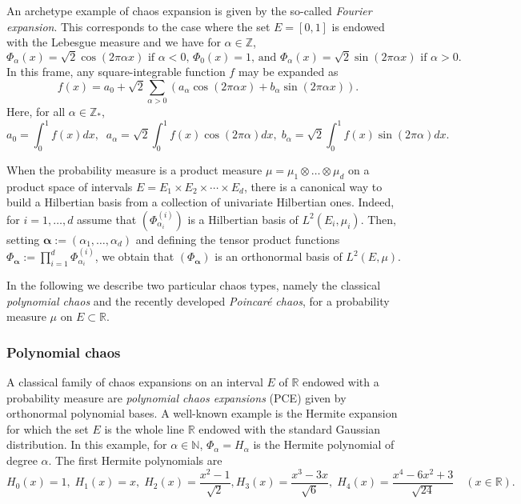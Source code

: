 \documentclass[a4paper,11pt]{article}
\newcommand{\Rr}{{\mathbb R}}
\newcommand{\Nn}{\mathbb{N}}
\newcommand{\ve}[1]{\boldsymbol{#1}}
\newcommand{\alp}{{\ve{\alpha}}}
\newcommand{\Phal}{\Phi_{\alp}}
\theoremstyle{definition}
\theoremstyle{remark}
\theoremstyle{theorem}
\begin{document}
An archetype example of chaos expansion is given by the so-called \textit{Fourier expansion}. This corresponds to the case where the set $E=[0,1]$ is endowed with the Lebesgue measure and we have for $\alpha\in\mathbb{Z}$,
\begin{equation*}
\Phi_\alpha(x)=\sqrt{2}\cos(2\pi\alpha x) \text{ if $\alpha < 0$, }
\Phi_0(x)=1 \text{, and } 
\Phi_\alpha(x)=\sqrt{2}\sin(2\pi\alpha x) \text{ if $\alpha > 0$.}
\end{equation*}
In this frame, any square-integrable function $f$ may be expanded as 
\begin{equation*}
f(x)=a_0+\sqrt{2}\sum_{\alpha>0}\left(a_\alpha\cos(2\pi\alpha x)+b_\alpha\sin(2\pi\alpha x)\right).
\end{equation*}
Here, for all $\alpha\in\mathbb{Z}_*$,
\begin{equation*}
a_0=\int_0^1f(x)dx, \;\;
a_\alpha = \sqrt{2} \int_0^1f(x)\cos(2\pi\alpha)dx,\; 
b_\alpha = \sqrt{2} \int_0^1f(x)\sin(2\pi\alpha)dx.
\end{equation*}

When the probability measure is a product measure $\mu = \mu_1 \otimes \dots \otimes \mu_d$ on a product space of intervals
$E=E_1\times E_2\times \cdots \times E_d$, 
there is a canonical way to build a Hilbertian basis from a collection of univariate Hilbertian ones. 
Indeed, for $i=1,\ldots, d$ assume that $(\Phi^{(i)}_{\alpha_i})$ is a Hilbertian basis of $L^2(E_i,\mu_i)$. Then, setting
$\alp:=(\alpha_1,\ldots,\alpha_d)$ and defining the tensor product functions $\Phal:=\prod_{i=1}^{d} \Phi^{(i)}_{\alpha_i}$,
we obtain that $(\Phal)$ is an orthonormal  basis of $L^2(E,\mu)$.

In the following we describe two particular chaos types, namely the classical \textit{polynomial chaos} and the recently developed \textit{Poincar\'e chaos}, for a probability measure $\mu$ on $E \subset \Rr$.

\subsubsection{Polynomial chaos}
\label{sec:PCE}

A classical family of chaos expansions on an interval $E$ of $\Rr$ endowed with a probability measure are \textit{polynomial chaos expansions} (PCE) given by orthonormal polynomial bases.
A well-known example is the Hermite expansion for which the set $E$ is the whole line $\Rr$ endowed with the standard Gaussian distribution. In this example, for $\alpha\in\Nn$, $\Phi_\alpha=H_{\alpha}$ is the Hermite polynomial of degree $\alpha$. The first Hermite polynomials are
\begin{equation*}
H_0(x)=1,\; H_1(x)=x,\; H_2(x)=\frac{x^2-1}{\sqrt{2}}, H_3(x)=\frac{x^3-3x}{\sqrt{6}},\;
H_4(x)=\frac{x^4-6x^2+3}{\sqrt{24}} \quad (x\in\Rr).
\end{equation*}
\end{document}
